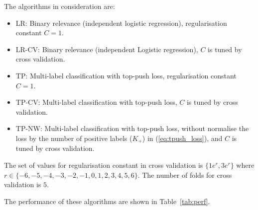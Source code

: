 \noindent
The algorithms in consideration are:
\begin{itemize}
\item LR: Binary relevance (\ie independent logistic regression), regularisation constant $C = 1$.
\item LR-CV: Binary relevance (\ie independent Logistic regression), $C$ is tuned by cross validation.
\item TP: Multi-label classification with top-push loss, regularisation constant $C=1$.
\item TP-CV: Multi-label classification with top-push loss, $C$ is tuned by cross validation.
\item TP-NW: Multi-label classification with top-push loss, without normalise the loss by the number of positive labels (\ie $K_+$)
             in (\ref{eq:tpush_loss}), and $C$ is tuned by cross validation.
\end{itemize}
The set of values for regularisation constant in cross validation is 
$\{ 1e^{r}, 3e^{r} \}$ where $r \in \{-6, -5, -4, -3, -2, -1, 0, 1, 2, 3, 4, 5, 6\}$. 
The number of folds for cross validation is $5$.


\noindent
The performance of these algorithms are shown in Table~\ref{tab:perf}.

